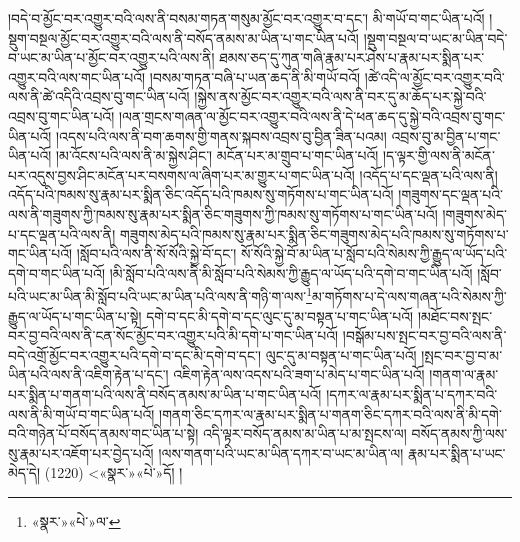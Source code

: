 །བདེ་བ་མྱོང་བར་འགྱུར་བའི་ལས་ནི་བསམ་གཏན་གསུམ་མྱོང་བར་འགྱུར་བ་དང་། མི་གཡོ་བ་གང་ཡིན་པའོ། །སྡུག་བསྔལ་མྱོང་བར་འགྱུར་བའི་ལས་ནི་བསོད་ནམས་མ་ཡིན་པ་གང་ཡིན་པའོ། །སྡུག་བསྔལ་བ་ཡང་མ་ཡིན་བདེ་བ་ཡང་མ་ཡིན་པ་མྱོང་བར་འགྱུར་པའི་ལས་ནི། ཐམས་ཅད་དུ་ཀུན་གཞི་རྣམ་པར་ཤེས་པ་རྣམ་པར་སྨིན་པར་འགྱུར་བའི་ལས་གང་ཡིན་པའོ། །བསམ་གཏན་བཞི་པ་ཡན་ཆད་ནི་མི་གཡོ་བའོ། །ཚེ་འདི་ལ་མྱོང་བར་འགྱུར་བའི་ལས་ནི་ཚེ་འདིའི་འབྲས་བུ་གང་ཡིན་པའོ། །སྐྱེས་ནས་མྱོང་བར་འགྱུར་བའི་ལས་ནི་བར་དུ་མ་ཆོད་པར་སྐྱེ་བའི་འབྲས་བུ་གང་ཡིན་པའོ། །ལན་གྲངས་གཞན་ལ་མྱོང་བར་འགྱུར་བའི་ལས་ནི་དེ་ཕན་ཆད་དུ་སྐྱེ་བའི་འབྲས་བུ་གང་ཡིན་པའོ། །འདས་པའི་ལས་ནི་བག་ཆགས་གྱི་གནས་སྐབས་འབྲས་བུ་བྱིན་ཟིན་པའམ། འབྲས་བུ་མ་བྱིན་པ་གང་ཡིན་པའོ། །མ་འོངས་པའི་ལས་ནི་མ་སྐྱེས་ཤིང་། མངོན་པར་མ་གྲུབ་པ་གང་ཡིན་པའོ། །ད་ལྟར་གྱི་ལས་ནི་མངོན་པར་འདུས་བྱས་ཤིང་མངོན་པར་བསགས་ལ་ཞིག་པར་མ་གྱུར་པ་གང་ཡིན་པའོ། །འདོད་པ་དང་ལྡན་པའི་ལས་ནི། འདོད་པའི་ཁམས་སུ་རྣམ་པར་སྨིན་ཅིང་འདོད་པའི་ཁམས་སུ་གཏོགས་པ་གང་ཡིན་པའོ། །གཟུགས་དང་ལྡན་པའི་ལས་ནི་གཟུགས་ཀྱི་ཁམས་སུ་རྣམ་པར་སྨིན་ཅིང་གཟུགས་ཀྱི་ཁམས་སུ་གཏོགས་པ་གང་ཡིན་པའོ། །གཟུགས་མེད་པ་དང་ལྡན་པའི་ལས་ནི། གཟུགས་མེད་པའི་ཁམས་སུ་རྣམ་པར་སྨིན་ཅིང་གཟུགས་མེད་པའི་ཁམས་སུ་གཏོགས་པ་གང་ཡིན་པའོ། །སློབ་པའི་ལས་ནི་སོ་སོའི་སྐྱེ་བོ་དང་། སོ་སོའི་སྐྱེ་བོ་མ་ཡིན་པ་སློབ་པའི་སེམས་ཀྱི་རྒྱུད་ལ་ཡོད་པའི་དགེ་བ་གང་ཡིན་པའོ། །མི་སློབ་པའི་ལས་ནི་མི་སློབ་པའི་སེམས་ཀྱི་རྒྱུད་ལ་ཡོད་པའི་དགེ་བ་གང་ཡིན་པའོ། །སློབ་པའི་ཡང་མ་ཡིན་མི་སློབ་པའི་ཡང་མ་ཡིན་པའི་ལས་ནི་གཉི་ག་ལས་\footnote{«སྣར་»«པེ་»ལ་}མ་གཏོགས་པ་དེ་ལས་གཞན་པའི་སེམས་ཀྱི་རྒྱུད་ལ་ཡོད་པ་གང་ཡིན་པ་སྟེ། དགེ་བ་དང་མི་དགེ་བ་དང་ལུང་དུ་མ་བསྟན་པ་གང་ཡིན་པའོ། །མཐོང་བས་སྤང་བར་བྱ་བའི་ལས་ནི་ངན་སོང་མྱོང་བར་འགྱུར་པའི་མི་དགེ་པ་གང་ཡིན་པའོ། །བསྒོམ་པས་སྤང་བར་བྱ་བའི་ལས་ནི་བདེ་འགྲོ་མྱོང་བར་འགྱུར་པའི་དགེ་བ་དང་མི་དགེ་བ་དང་། ལུང་དུ་མ་བསྟན་པ་གང་ཡིན་པའོ། །སྤང་བར་བྱ་བ་མ་ཡིན་པའི་ལས་ནི་འཇིག་རྟེན་པ་དང་། འཇིག་རྟེན་ལས་འདས་པའི་ཟག་པ་མེད་པ་གང་ཡིན་པའོ། །གནག་ལ་རྣམ་པར་སྨིན་པ་གནག་པའི་ལས་ནི་བསོད་ནམས་མ་ཡིན་པ་གང་ཡིན་པའོ། །དཀར་ལ་རྣམ་པར་སྨིན་པ་དཀར་བའི་ལས་ནི་མི་གཡོ་བ་གང་ཡིན་པའོ། །གནག་ཅིང་དཀར་ལ་རྣམ་པར་སྨིན་པ་གནག་ཅིང་དཀར་བའི་ལས་ནི་མི་དགེ་བའི་གཉེན་པོ་བསོད་ནམས་གང་ཡིན་པ་སྟེ། འདི་ལྟར་བསོད་ནམས་མ་ཡིན་པ་མ་སྤངས་ལ། བསོད་ནམས་ཀྱི་ལས་སུ་རྣམ་པར་འཇོག་པར་བྱེད་པའོ། །ལས་གནག་པའི་ཡང་མ་ཡིན་དཀར་བ་ཡང་མ་ཡིན་ལ། རྣམ་པར་སྨིན་པ་ཡང་མེད་དེ། (1220) <«སྣར་»«པེ་»དོ། །
